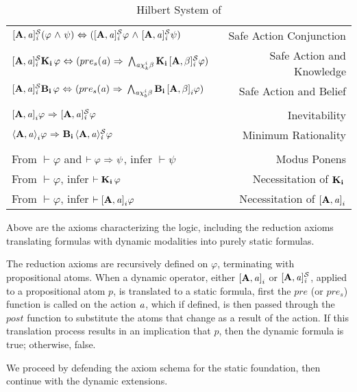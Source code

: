 \begin{table}[H]
\begin{center}
\begin{tabular}{| l r |}
    $\mathbf{[A,\mathit{a}]_{\mathit{i}}^\mathcal{S}}(\varphi {\ \wedge \ } \psi) {\ \Leftrightarrow \ } (\mathbf{[A,\mathit{a}]_{\mathit{i}}^\mathcal{S}}\varphi {\ \wedge \ } \mathbf{[A,\mathit{a}]_{\mathit{i}}^\mathcal{S}}\psi)$ & Safe Action Conjunction\\
    $\mathbf{[A,\mathit{a}]_{\mathit{i}}^\mathcal{S}}\mathbf{K}_{\mathbf{i}}\,\varphi {\ \Leftrightarrow \ } (pre_s(\mathit{a}){\ \Rightarrow \ } \bigwedge_{\mathit{a}\chi_{k}^i\beta}\mathbf{K}_{\mathbf{i}}\,\mathbf{[A,\beta]_{\mathit{i}}^\mathcal{S}}\varphi)$ & Safe Action and Knowledge\\
    $\mathbf{[A,\mathit{a}]_{\mathit{i}}^\mathcal{S}}\mathbf{B}_{\mathbf{i}}\,\varphi {\ \Leftrightarrow \ } (pre_s(\mathit{a}){\ \Rightarrow \ } \bigwedge_{\mathit{a}\chi_{b}^i\beta}\mathbf{B}_{\mathbf{i}}\,\mathbf{[A,\beta]}_i\varphi)$ & Safe Action and Belief\\ 
	&\\
    $\mathbf{[A,\mathit{a}]}_i\varphi {\ \Rightarrow \ } \mathbf{[A,\mathit{a}]_{\mathit{i}}^\mathcal{S}}\varphi$ & Inevitability\\
    $\mathbf{\langle A,\mathit{a}\rangle}_i\varphi {\ \Rightarrow \ } \mathbf{B}_{\mathbf{i}}\,\mathbf{\langle A,\mathit{a}\rangle_{\mathit{i}}^\mathcal{S}}\varphi$ & Minimum Rationality\\
    &\\
    From $\vdash \varphi$ and $\vdash \varphi {\ \Rightarrow \ } \psi$, infer $\vdash\psi$ & Modus Ponens\\
    From $\vdash \varphi$, infer $\vdash \mathbf{K}_{\mathbf{i}}\,\varphi$ & Necessitation of $\mathbf{K}_{\mathbf{i}}\,$\\
    From $\vdash \varphi$, infer $\vdash \mathbf{[A,\mathit{a}]}_i\varphi$ & Necessitation of $\mathbf{[A,\mathit{a}]}_i$\\
	\hline
\end{tabular}
\caption{Hilbert System of \DASL}
\end{center}
\end{table}

Above are the axioms characterizing the logic, including the reduction axioms translating formulas with dynamic modalities into purely static formulas.

The reduction axioms are recursively defined on $\varphi$, terminating with propositional atoms. When a dynamic operator, either $\mathbf{[A,\mathit{a}]}_i$ or $\mathbf{[A,\mathit{a}]_{\mathit{i}}^\mathcal{S}}$, applied to a propositional atom $p$, is translated to a static formula, first the $pre$ (or $pre_s$) function is called on the action $\mathit{a}$, which if defined, is then passed through the $post$ function to substitute the atoms that change as a result of the action. If this translation process results in an implication that $p$, then the dynamic formula is true; otherwise, false.

We proceed by defending the axiom schema for the static foundation, then continue with the dynamic extensions.

